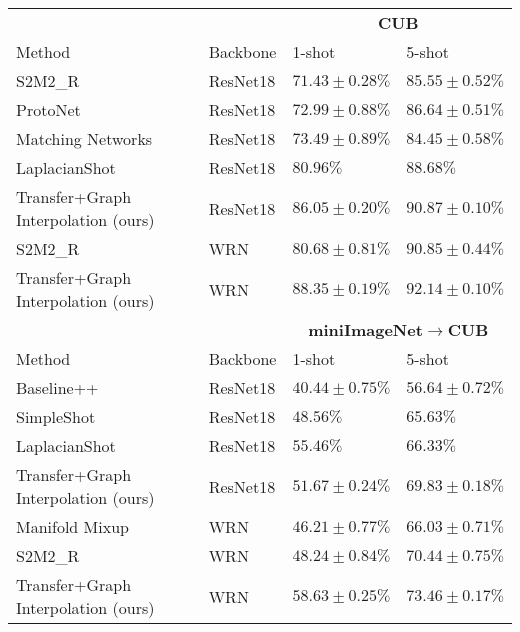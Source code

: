 \documentclass[a4paper,conference]{IEEEtran}
\begin{document}
\begin{table*}
{\begin{tabular}{l|l|l|l}
         \toprule
         &          & \multicolumn{2}{c}{\textbf{CUB}} \\
         Method & Backbone & 1-shot & 5-shot \\       
         \midrule
S2M2\_R~\cite{mangla2020charting} & ResNet18 & $71.43\pm0.28\%$ & $85.55\pm0.52\%$\\
         ProtoNet~\cite{snell2017prototypical} & ResNet18 & $72.99\pm0.88\%$ & $86.64\pm0.51\%$\\
         Matching Networks~\cite{vinyals2016matching} & ResNet18 & $73.49\pm0.89\%$ & $84.45\pm0.58\%$\\ 
         LaplacianShot~\cite{ziko2020laplacian} & ResNet18 & $80.96\%$ & $88.68\%$\\
         Transfer+Graph Interpolation (ours) & ResNet18 & $\mathbf{86.05\pm0.20\%}$ & $\mathbf{90.87\pm0.10\%}$\\
         \midrule
         S2M2\_R~\cite{mangla2020charting} & WRN & $80.68\pm0.81\%$ & $90.85\pm0.44\%$\\
         Transfer+Graph Interpolation (ours) & WRN & $\mathbf{88.35\pm0.19\%}$ & $\mathbf{92.14\pm0.10\%}$\\
         \bottomrule
         
         \toprule
         &          & \multicolumn{2}{c}{\textbf{miniImageNet}$\longrightarrow$\textbf{CUB}} \\
         Method & Backbone & 1-shot & 5-shot \\
         \midrule
         Baseline++~\cite{chen2019closer} & ResNet18 & $40.44\pm0.75\%$ & $56.64\pm0.72\%$\\
         SimpleShot~\cite{wang2019simpleshot} & ResNet18 & $48.56\%$ & $65.63\%$\\
         LaplacianShot~\cite{ziko2020laplacian} & ResNet18 & $\mathbf{55.46}\%$ & $66.33\%$\\
         Transfer+Graph Interpolation (ours) & ResNet18 & $51.67\pm0.24\%$ & $\mathbf{69.83\pm0.18\%}$\\
         \midrule
         Manifold Mixup~\cite{verma2018manifold} & WRN & $46.21\pm0.77\%$ & $66.03\pm0.71\%$\\
         S2M2\_R~\cite{mangla2020charting} & WRN & $48.24\pm0.84\%$ & $70.44\pm0.75\%$\\
         Transfer+Graph Interpolation (ours) & WRN & $\mathbf{58.63\pm0.25\%}$ & $\mathbf{73.46\pm0.17\%}$\\
         \bottomrule
         

\end{tabular}}
\end{table*}
\end{document}
